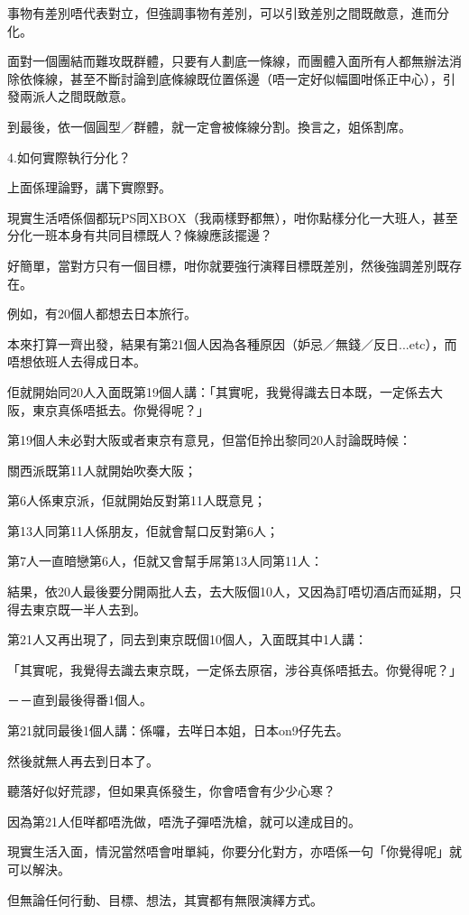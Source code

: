 事物有差別唔代表對立，但強調事物有差別，可以引致差別之間既敵意，進而分化。

面對一個團結而難攻既群體，只要有人劃底一條線，而團體入面所有人都無辦法消除依條線，甚至不斷討論到底條線既位置係邊（唔一定好似幅圖咁係正中心），引發兩派人之間既敵意。

到最後，依一個圓型／群體，就一定會被條線分割。換言之，姐係割席。

4.如何實際執行分化？

上面係理論野，講下實際野。

現實生活唔係個都玩PS同XBOX（我兩樣野都無），咁你點樣分化一大班人，甚至分化一班本身有共同目標既人？條線應該擺邊？

好簡單，當對方只有一個目標，咁你就要強行演釋目標既差別，然後強調差別既存在。

例如，有20個人都想去日本旅行。

本來打算一齊出發，結果有第21個人因為各種原因（妒忌／無錢／反日...etc），而唔想依班人去得成日本。

佢就開始同20人入面既第19個人講：「其實呢，我覺得識去日本既，一定係去大阪，東京真係唔抵去。你覺得呢？」

第19個人未必對大阪或者東京有意見，但當佢拎出黎同20人討論既時候：

關西派既第11人就開始吹奏大阪；

第6人係東京派，佢就開始反對第11人既意見；

第13人同第11人係朋友，佢就會幫口反對第6人；

第7人一直暗戀第6人，佢就又會幫手屌第13人同第11人：

結果，依20人最後要分開兩批人去，去大阪個10人，又因為訂唔切酒店而延期，只得去東京既一半人去到。

第21人又再出現了，同去到東京既個10個人，入面既其中1人講：

「其實呢，我覺得去識去東京既，一定係去原宿，涉谷真係唔抵去。你覺得呢？」

－－直到最後得番1個人。

第21就同最後1個人講：係囉，去咩日本姐，日本on9仔先去。

然後就無人再去到日本了。

聽落好似好荒謬，但如果真係發生，你會唔會有少少心寒？

因為第21人佢咩都唔洗做，唔洗子彈唔洗槍，就可以達成目的。

現實生活入面，情況當然唔會咁單純，你要分化對方，亦唔係一句「你覺得呢」就可以解決。

但無論任何行動、目標、想法，其實都有無限演繹方式。

